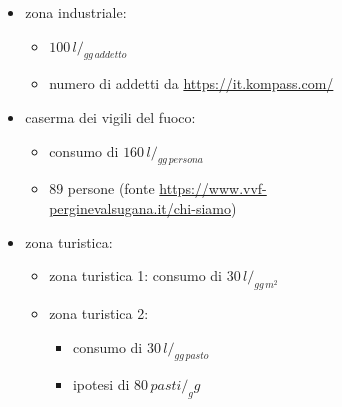 \documentclass{beamer}
\begin{document}
{\begin{frame}[allowframebreaks]
\begin{columns}
\begin{column}{.45\textwidth}
\begin{figure}
   \end{figure}
  \end{column}
%
  \begin{column}{0.55\textwidth}
   \begin{itemize}
    \item zona industriale:
    \begin{itemize}
     \item $100\,l/_{gg\,addetto}$
     \item numero di addetti da \url{https://it.kompass.com/}
    \end{itemize}
    \item caserma dei vigili del fuoco: 
    \begin{itemize}
     \item consumo di $160\,l/_{gg\,persona}$
     \item $89$ persone (fonte \url{https://www.vvf-perginevalsugana.it/chi-siamo})
    \end{itemize}
    \item zona turistica:
    \begin{itemize}
     \item zona turistica 1: consumo di $30\,l/_{gg\,m^2}$
     \item zona turistica 2:
     \begin{itemize}
      \item consumo di $30\,l/_{gg\,pasto}$
      \item ipotesi di $80\,pasti/_gg$
     \end{itemize}
    \end{itemize}
   \end{itemize}
  \end{column}
 \end{columns}

\end{frame}}
\end{document}
